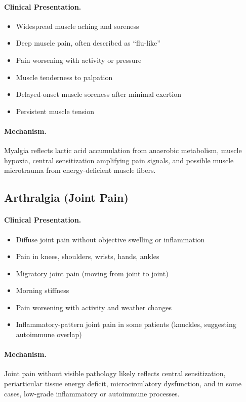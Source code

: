 \paragraph{Clinical Presentation.}
\begin{itemize}
    \item Widespread muscle aching and soreness
    \item Deep muscle pain, often described as ``flu-like''
    \item Pain worsening with activity or pressure
    \item Muscle tenderness to palpation
    \item Delayed-onset muscle soreness after minimal exertion
    \item Persistent muscle tension
\end{itemize}

\paragraph{Mechanism.}
Myalgia reflects lactic acid accumulation from anaerobic metabolism, muscle hypoxia, central sensitization amplifying pain signals, and possible muscle microtrauma from energy-deficient muscle fibers.

\subsection{Arthralgia (Joint Pain)}
\label{subsec:arthralgia}

\paragraph{Clinical Presentation.}
\begin{itemize}
    \item Diffuse joint pain without objective swelling or inflammation
    \item Pain in knees, shoulders, wrists, hands, ankles
    \item Migratory joint pain (moving from joint to joint)
    \item Morning stiffness
    \item Pain worsening with activity and weather changes
    \item Inflammatory-pattern joint pain in some patients (knuckles, suggesting autoimmune overlap)
\end{itemize}

\paragraph{Mechanism.}
Joint pain without visible pathology likely reflects central sensitization, periarticular tissue energy deficit, microcirculatory dysfunction, and in some cases, low-grade inflammatory or autoimmune processes.

